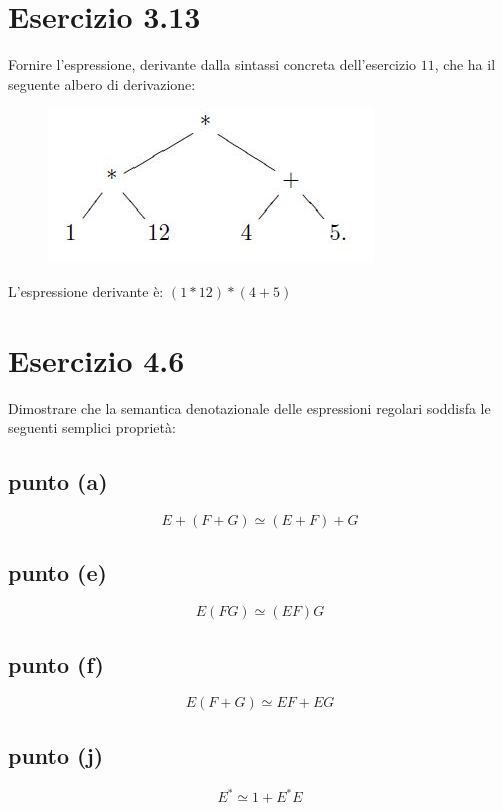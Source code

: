 	\section{Esercizio 3.13}
		\qquad Fornire l'espressione, derivante dalla sintassi concreta
		dell'esercizio $11$, che ha il seguente albero di derivazione:
		
		\begin{figure}[h]
			\centering
			\includegraphics[scale=0.5]{img/3-13}
		\end{figure}
		
		\sectionline
		
		\qquad L'espressione derivante \`e: $(1*12)*(4+5)$
		
		\newpage
	
	\newpage \section{Esercizio 4.6}
		\qquad Dimostrare che la semantica denotazionale delle espressioni regolari
		soddisfa le seguenti semplici proprietà:
		\subsection{punto (a)}
			$$E+(F+G) \simeq (E+F)+G$$
		\subsection{punto (e)}
			$$E(FG) \simeq (EF)G$$
		\subsection{punto (f)}
			$$E(F+G) \simeq EF+EG$$
		\subsection{punto (j)}
			$$E^* \simeq 1+E^*E$$
			
		\sectionline
		
